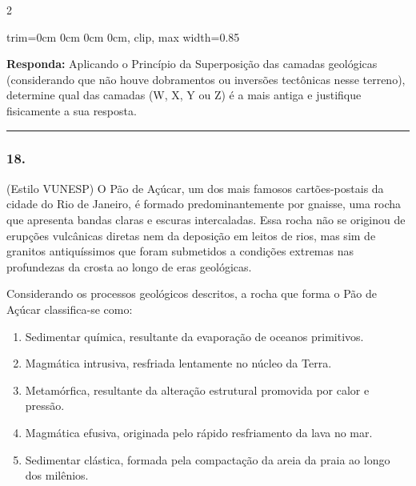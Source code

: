 \documentclass[twoside, 10pt, a4paper]{article}
\newlength{\espacoPreQuestao}
\newlength{\espacoQuestao}
\newlength{\espacoAlt}
\newcommand{\larguraTikz}{0.85\linewidth}
\begin{document}
\begin{multicols*}{2}
\begin{center}
\begin{adjustbox}{trim=0cm 0cm 0cm 0cm, clip, max width=\larguraTikz}
\end{adjustbox}
\end{center}

\begin{boxresponda}
\textbf{Responda:} Aplicando o Princípio da Superposição das camadas geológicas (considerando que não houve dobramentos ou inversões tectônicas nesse terreno), determine qual das camadas (W, X, Y ou Z) é a mais antiga e justifique fisicamente a sua resposta.
\end{boxresponda}
\par\vspace{\espacoQuestao}

\noindent\textcolor{CorLinha}{\rule{\linewidth}{0.5pt}} 
\par\vspace{\espacoPreQuestao}
\subsubsection*{18.} (Estilo VUNESP) O Pão de Açúcar, um dos mais famosos cartões-postais da cidade do Rio de Janeiro, é formado predominantemente por gnaisse, uma rocha que apresenta bandas claras e escuras intercaladas. Essa rocha não se originou de erupções vulcânicas diretas nem da deposição em leitos de rios, mas sim de granitos antiquíssimos que foram submetidos a condições extremas nas profundezas da crosta ao longo de eras geológicas.

Considerando os processos geológicos descritos, a rocha que forma o Pão de Açúcar classifica-se como:

\begin{enumerate}[label=\alph*), itemsep=\espacoAlt]
\item Sedimentar química, resultante da evaporação de oceanos primitivos.
\item Magmática intrusiva, resfriada lentamente no núcleo da Terra.
\item Metamórfica, resultante da alteração estrutural promovida por calor e pressão.
\item Magmática efusiva, originada pelo rápido resfriamento da lava no mar.
\item Sedimentar clástica, formada pela compactação da areia da praia ao longo dos milênios.
\end{enumerate}
\par\vspace{\espacoQuestao}


\end{multicols*}
\end{document}

